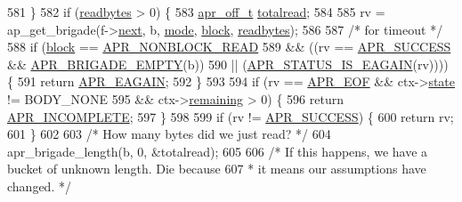 \begin{DoxyCode}
{{{{{581             \}
582             \textcolor{keywordflow}{if} (\hyperlink{group__APACHE__CORE__FILTER_ga0ce3dc88443223a04b0d1a3167356aee}{readbytes} > 0) \{
583                 \hyperlink{group__apr__platform_ga6938af9075cec15c88299109381aa984}{apr\_off\_t} \hyperlink{ab_8c_a820ac3597d0f57ceb3428345978194e9}{totalread};
584 
585                 rv = ap\_get\_brigade(f->\hyperlink{structap__filter__t_af4835ed2c41734061dc374d92ba401a2}{next}, b, \hyperlink{group__APACHE__CORE__FILTER_gad194431669b7d1f96d2dacfb7be21261}{mode}, \hyperlink{group__APACHE__CORE__FILTER_gafe0ebf200b97a61a45c0513334da9ab6}{block}, 
      \hyperlink{group__APACHE__CORE__FILTER_ga0ce3dc88443223a04b0d1a3167356aee}{readbytes});
586 
587                 \textcolor{comment}{/* for timeout */}
588                 \textcolor{keywordflow}{if} (\hyperlink{group__APACHE__CORE__FILTER_gafe0ebf200b97a61a45c0513334da9ab6}{block} == \hyperlink{group__APR__Util__Bucket__Brigades_gga756973fb6392bd1026c3d96b4519776da42b97663ca71fbbf2e2af7c8192e5dd8}{APR\_NONBLOCK\_READ}
589                         && ((rv == \hyperlink{group__apr__errno_ga9ee311b7bf1c691dc521d721339ee2a6}{APR\_SUCCESS} && \hyperlink{group__APR__Util__Bucket__Brigades_ga836f61da6cce15074eff257ce4b6fc0f}{APR\_BRIGADE\_EMPTY}(b))
590                                 || (\hyperlink{group__APR__STATUS__IS_ga9dd578bfcd76a2d997395608ae5b3a4e}{APR\_STATUS\_IS\_EAGAIN}(rv)))) \{
591                     \textcolor{keywordflow}{return} \hyperlink{group__APR__Error_ga0b2a5ebb819de5ce93d326939b586578}{APR\_EAGAIN};
592                 \}
593 
594                 \textcolor{keywordflow}{if} (rv == \hyperlink{group__APR__Error_ga35d9dca2514c522a2840aca0f3e2ebd3}{APR\_EOF} && ctx->\hyperlink{structhttp__filter__ctx_a2e84a1c737dd4daa565b328c875402cb}{state} != BODY\_NONE
595                         && ctx->\hyperlink{structhttp__filter__ctx_a669e4805b3738b515c0bc6d56f0f7ea7}{remaining} > 0) \{
596                     \textcolor{keywordflow}{return} \hyperlink{group__APR__Error_ga64dff43b83bcefd3f3c751be6b864ca1}{APR\_INCOMPLETE};
597                 \}
598 
599                 \textcolor{keywordflow}{if} (rv != \hyperlink{group__apr__errno_ga9ee311b7bf1c691dc521d721339ee2a6}{APR\_SUCCESS}) \{
600                     \textcolor{keywordflow}{return} rv;
601                 \}
602 
603                 \textcolor{comment}{/* How many bytes did we just read? */}
604                 apr\_brigade\_length(b, 0, &totalread);
605 
606                 \textcolor{comment}{/* If this happens, we have a bucket of unknown length.  Die because}
607 \textcolor{comment}{                 * it means our assumptions have changed. */}
}}}}}
\end{DoxyCode}
